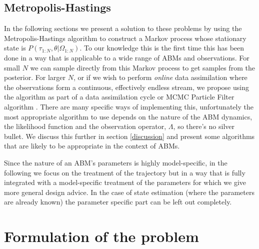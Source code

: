 \documentclass{article}
\begin{document}
\subsection{Metropolis-Hastings}
In the following sections we present a solution to these problems by using the Metropolis-Hastings algorithm to construct a Markov process whose stationary state is $P(\tau_{1:N},\theta|\Omega_{1:N})$. To our knowledge this is the first time this has been done in a way that is applicable to a wide range of ABMs and observations. For small $N$ we can sample directly from this Markov process to get samples from the posterior. For larger $N$, or if we wish to perform \textit{online} data assimilation where the observations form a continuous, effectively endless stream, we propose using the algorithm as part of a data assimilation cycle or MCMC Particle Filter algorithm \citep*{finke2020limit, septier2009mcmc}. There are many specific ways of implementing this, unfortunately the most appropriate algorithm to use depends on the nature of the ABM dynamics, the likelihood function and the observation operator, $\Lambda$, so there's no silver bullet. We discuss this further in section \ref{discussion} and present some algorithms that are likely to be appropriate in the context of ABMs.

Since the nature of an ABM's parameters is highly model-specific, in the following we focus on the treatment of the trajectory but in a way that is fully integrated with a model-specific treatment of the parameters for which we give more general design advice. In the case of state estimation (where the parameters are already known) the parameter specific part can be left out completely.

\section{Formulation of the problem}
\end{document}
